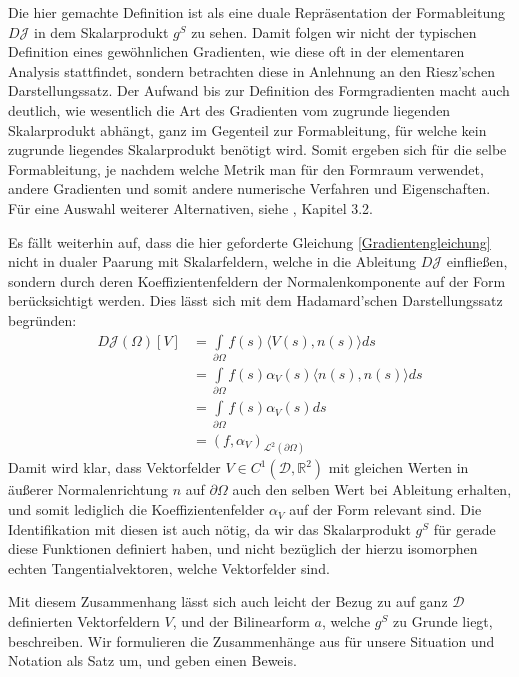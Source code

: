 Die hier gemachte Definition ist als eine duale Repräsentation der Formableitung $D\mathcal{J}$ in dem Skalarprodukt $g^S$ zu sehen. Damit folgen wir nicht der typischen Definition eines gewöhnlichen Gradienten, wie diese oft in der elementaren Analysis stattfindet, sondern betrachten diese in Anlehnung an den  Riesz'schen Darstellungssatz. Der Aufwand bis zur Definition des Formgradienten macht auch deutlich, wie wesentlich die Art des Gradienten vom zugrunde liegenden Skalarprodukt abhängt, ganz im Gegenteil zur Formableitung, für welche kein zugrunde liegendes Skalarprodukt benötigt wird. Somit ergeben sich für die selbe Formableitung, je nachdem welche Metrik man für den Formraum verwendet, andere Gradienten und somit andere numerische Verfahren und Eigenschaften. Für eine Auswahl weiterer Alternativen, siehe \cite{shape_space}, Kapitel 3.2.

Es fällt weiterhin auf, dass die hier geforderte Gleichung \ref{Gradientengleichung} nicht in dualer Paarung mit Skalarfeldern, welche in die Ableitung $D\mathcal{J}$ einfließen, sondern durch deren Koeffizientenfeldern der Normalenkomponente auf der Form berücksichtigt werden. Dies lässt sich mit dem Hadamard'schen Darstellungssatz begründen:
\begin{align*}
	D\mathcal{J}(\Omega)[V] &= \underset{\partial\Omega}{\int}f(s)\langle V(s),n(s)\rangle ds \\
	&=\underset{\partial\Omega}{\int}f(s) \alpha_V(s)\langle n(s),n(s)\rangle ds \\
	&=\underset{\partial\Omega}{\int}f(s) \alpha_V(s) ds \\
	&= (f,\alpha_V)_{\mathcal{L}^2(\partial\Omega)}
\end{align*}
Damit wird klar, dass Vektorfelder $V\in C^1(\mathcal{D},\mathbb{R}^2)$ mit gleichen Werten in äußerer Normalenrichtung $n$ auf $\partial\Omega$ auch den selben Wert bei Ableitung erhalten, und somit lediglich die Koeffizientenfelder $\alpha_V$ auf der Form relevant sind. Die Identifikation mit diesen ist auch nötig, da wir das Skalarprodukt $g^S$ für gerade diese Funktionen definiert haben, und nicht bezüglich der hierzu isomorphen echten Tangentialvektoren, welche Vektorfelder sind.

Mit diesem Zusammenhang lässt sich auch leicht der Bezug zu auf ganz $\mathcal{D}$ definierten Vektorfeldern $V$, und der Bilinearform $a$, welche $g^S$ zu Grunde liegt, beschreiben. Wir formulieren die Zusammenhänge aus \cite{bfgs2} für unsere Situation und Notation als Satz um, und geben einen Beweis. 

